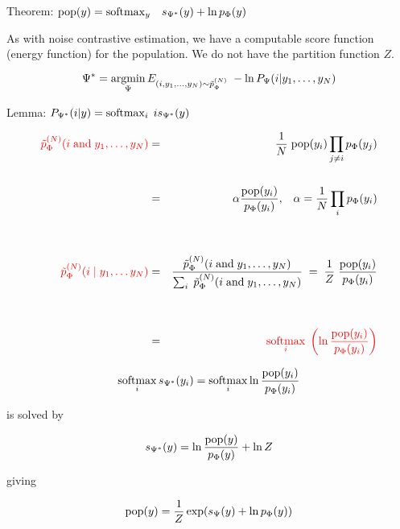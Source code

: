 \vfill
Theorem: {\color{red} $\mathrm{pop}(y) = \operatorname*{softmax}_y\;\;\; s_{\Psi^*}(y) + \ln p_\Phi(y)$}

\vfill
As with noise contrastive estimation, we have a computable score function (energy function) for the population.  We do not have the partition function $Z$.


$$\Psi^* = \operatorname*{argmin}_\Psi E_{(i,y_1,\ldots,y_{N}) \sim \tilde{p}_\Phi^{(N)}} \;- \ln P_\Psi(i|y_1,\ldots,y_{N})$$

\vfill
Lemma: {\color{red} $P_{\Psi^*}(i|y)  =  \operatorname*{softmax}_i\;is_{\Psi^*}(y)$}

{\huge
\begin{eqnarray*}
{\color{red} \tilde{p}_\Phi^{(N)}(i \;\mathrm{and}\;y_1,\ldots,y_{N})} & = & \frac{1}{N}\;\mathrm{pop}(y_i)\prod_{j \not = i}p_\Phi(y_j) \\
\\
& = & \alpha \frac{\mathrm{pop}(y_i)}{p_\Phi(y_i)},\;\;\;\alpha = \frac{1}{N} \prod_i p_\Phi(y_i) \\
\\
\\
{\color{red} \tilde{p}_\Phi^{(N)}(i\;|\;y_1,\ldots y_{N})} & = & \frac{\tilde{p}_\Phi^{(N)}(i\;\mbox{and} \; y_1,\ldots,y_{N})}{\sum_i \;\tilde{p}_\Phi^{(N)}(i \;\mbox{and}\; y_1,\ldots,y_{N})} \;=\;\frac{1}{Z} \;\frac{\mathrm{pop}(y_i)}{p_\Phi(y_i)} \\
\\
\\
& = & {\color{red} \operatorname*{softmax}_i\; \left(\ln \frac{\mathrm{pop}(y_i)}{p_\Phi(y_i)}\right)}
\end{eqnarray*}
}


$$\operatorname*{softmax}_i s_{\Psi^*}(y_i) =  \operatorname*{softmax}_i \ln \frac{\mathrm{pop}(y_i)}{p_\Phi(y_i)}$$

\vfill
is solved by

\vfill
$$s_{\Psi^*}(y) = \ln \frac{\mathrm{pop}(y)}{p_\Phi(y)} + \ln Z$$

\vfill
giving

$$\mathrm{pop}(y) = \frac{1}{Z} \exp(s_\Psi(y) + \ln p_\Phi(y))$$
